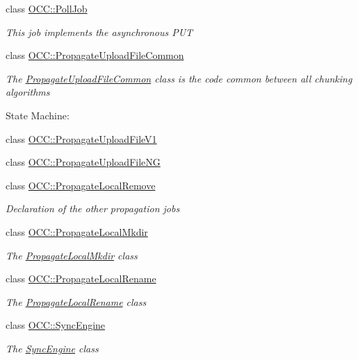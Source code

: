 \begin{DoxyCompactItemize}
class \hyperlink{class_o_c_c_1_1_poll_job}{O\+C\+C\+::\+Poll\+Job}
\begin{DoxyCompactList}\small\item\em This job implements the asynchronous P\+UT \end{DoxyCompactList}\item 
class \hyperlink{class_o_c_c_1_1_propagate_upload_file_common}{O\+C\+C\+::\+Propagate\+Upload\+File\+Common}
\begin{DoxyCompactList}\small\item\em The \hyperlink{class_o_c_c_1_1_propagate_upload_file_common}{Propagate\+Upload\+File\+Common} class is the code common between all chunking algorithms

State Machine\+: \end{DoxyCompactList}\item 
class \hyperlink{class_o_c_c_1_1_propagate_upload_file_v1}{O\+C\+C\+::\+Propagate\+Upload\+File\+V1}
\item 
class \hyperlink{class_o_c_c_1_1_propagate_upload_file_n_g}{O\+C\+C\+::\+Propagate\+Upload\+File\+NG}
\item 
class \hyperlink{class_o_c_c_1_1_propagate_local_remove}{O\+C\+C\+::\+Propagate\+Local\+Remove}
\begin{DoxyCompactList}\small\item\em Declaration of the other propagation jobs \end{DoxyCompactList}\item 
class \hyperlink{class_o_c_c_1_1_propagate_local_mkdir}{O\+C\+C\+::\+Propagate\+Local\+Mkdir}
\begin{DoxyCompactList}\small\item\em The \hyperlink{class_o_c_c_1_1_propagate_local_mkdir}{Propagate\+Local\+Mkdir} class \end{DoxyCompactList}\item 
class \hyperlink{class_o_c_c_1_1_propagate_local_rename}{O\+C\+C\+::\+Propagate\+Local\+Rename}
\begin{DoxyCompactList}\small\item\em The \hyperlink{class_o_c_c_1_1_propagate_local_rename}{Propagate\+Local\+Rename} class \end{DoxyCompactList}\item 
class \hyperlink{class_o_c_c_1_1_sync_engine}{O\+C\+C\+::\+Sync\+Engine}
\begin{DoxyCompactList}\small\item\em The \hyperlink{class_o_c_c_1_1_sync_engine}{Sync\+Engine} class \end{DoxyCompactList}\item 

\end{DoxyCompactItemize}
